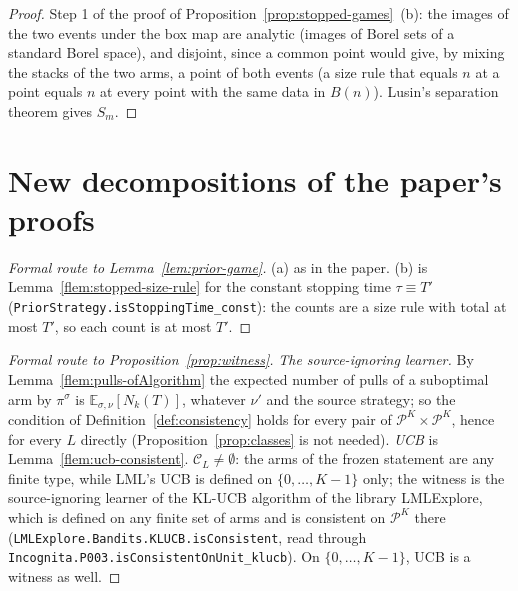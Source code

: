 \documentclass[11pt]{article}
\newcommand{\E}{\mathbb{E}}
\begin{document}
\begin{proof}
Step 1 of the proof of Proposition~\ref{prop:stopped-games}~(b): the images of the two events under
the box map are analytic (images of Borel sets of a standard Borel space), and disjoint, since a
common point would give, by mixing the stacks of the two arms, a point of both events (a size rule
that equals $n$ at a point equals $n$ at every point with the same data in $B(n)$). Lusin's
separation theorem gives $S_m$.
\end{proof}

\section{New decompositions of the paper's proofs}

\begin{proof}[Formal route to Lemma~\ref{lem:prior-game}]
(a) as in the paper. (b) is Lemma~\ref{flem:stopped-size-rule} for the constant stopping time
$\tau\equiv T'$ (\texttt{PriorStrategy.isStoppingTime\_const}): the counts are a size rule with total
at most $T'$, so each count is at most $T'$.
\end{proof}

\begin{proof}[Formal route to Proposition~\ref{prop:witness}]
\emph{The source-ignoring learner.} By Lemma~\ref{flem:pulls-ofAlgorithm} the expected number of
pulls of a suboptimal arm by $\pi^\sigma$ is $\E_{\sigma,\nu}[N_k(T)]$, whatever $\nu'$ and the
source strategy; so the condition of Definition~\ref{def:consistency} holds for every pair of
$\mathcal P^K\times\mathcal P^K$, hence for every $L$ directly (Proposition~\ref{prop:classes} is
not needed). \emph{UCB} is Lemma~\ref{flem:ucb-consistent}. \emph{$\mathcal C_L\neq\emptyset$}: the
arms of the frozen statement are any finite type, while LML's UCB is defined on $\{0,\dots,K-1\}$
only; the witness is the source-ignoring learner of the KL-UCB algorithm of the library
LMLExplore, which is defined on any finite set of arms and is consistent on $\mathcal P^K$ there
(\texttt{LMLExplore.Bandits.KLUCB.isConsistent}, read through
\texttt{Incognita.P003.isConsistentOnUnit\_klucb}). On $\{0,\dots,K-1\}$, UCB is a witness as
well.
\end{proof}
\end{document}
